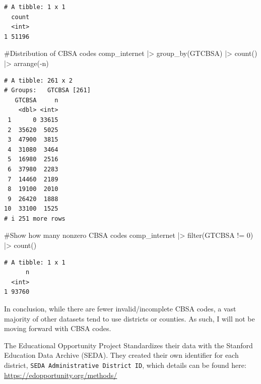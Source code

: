 \documentclass[
  letterpaper,
  DIV=11,
  numbers=noendperiod]{scrartcl}
\newenvironment{Shaded}{\begin{snugshade}}{\end{snugshade}}
\newcommand{\CommentTok}[1]{\textcolor[rgb]{0.37,0.37,0.37}{#1}}
\newcommand{\DecValTok}[1]{\textcolor[rgb]{0.68,0.00,0.00}{#1}}
\newcommand{\FunctionTok}[1]{\textcolor[rgb]{0.28,0.35,0.67}{#1}}
\newcommand{\NormalTok}[1]{\textcolor[rgb]{0.00,0.23,0.31}{#1}}
\newcommand{\SpecialCharTok}[1]{\textcolor[rgb]{0.37,0.37,0.37}{#1}}
\begin{document}
\begin{verbatim}
# A tibble: 1 x 1
  count
  <int>
1 51196
\end{verbatim}

\begin{Shaded}
\begin{Highlighting}[]
\CommentTok{\#Distribution of CBSA codes}
\NormalTok{comp\_internet }\SpecialCharTok{|\textgreater{}}
  \FunctionTok{group\_by}\NormalTok{(GTCBSA) }\SpecialCharTok{|\textgreater{}}
  \FunctionTok{count}\NormalTok{() }\SpecialCharTok{|\textgreater{}}
  \FunctionTok{arrange}\NormalTok{(}\SpecialCharTok{{-}}\NormalTok{n)}
\end{Highlighting}
\end{Shaded}

\begin{verbatim}
# A tibble: 261 x 2
# Groups:   GTCBSA [261]
   GTCBSA     n
    <dbl> <int>
 1      0 33615
 2  35620  5025
 3  47900  3815
 4  31080  3464
 5  16980  2516
 6  37980  2283
 7  14460  2189
 8  19100  2010
 9  26420  1888
10  33100  1525
# i 251 more rows
\end{verbatim}

\begin{Shaded}
\begin{Highlighting}[]
\CommentTok{\#Show how many nonzero CBSA codes}
\NormalTok{comp\_internet }\SpecialCharTok{|\textgreater{}}
  \FunctionTok{filter}\NormalTok{(GTCBSA }\SpecialCharTok{!=} \DecValTok{0}\NormalTok{) }\SpecialCharTok{|\textgreater{}}
  \FunctionTok{count}\NormalTok{()}
\end{Highlighting}
\end{Shaded}

\begin{verbatim}
# A tibble: 1 x 1
      n
  <int>
1 93760
\end{verbatim}

In conclusion, while there are fewer invalid/incomplete CBSA codes, a
vast majority of other datasets tend to use districts or counties. As
such, I will not be moving forward with CBSA codes.

The Educational Opportunity Project Standardizes their data with the
Stanford Education Data Archive (SEDA). They created their own
identifier for each district,
\texttt{SEDA\ Administrative\ District\ ID}, which details can be found
here: \url{https://edopportunity.org/methods/}
\end{document}
